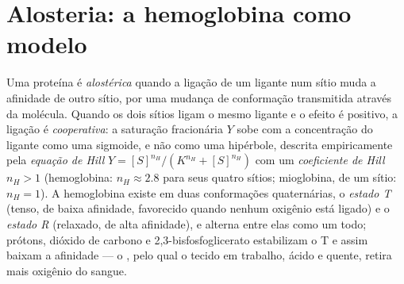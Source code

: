 \section{Alosteria: a hemoglobina como modelo}

\begin{definition}\label{def:b3:structural-biology:allostery}
Uma proteína é \emph{alostérica} quando a ligação de um ligante num
sítio muda a afinidade de outro sítio, por uma mudança de conformação
transmitida através da molécula. Quando os dois sítios ligam o mesmo
ligante e o efeito é positivo, a ligação é \emph{cooperativa}: a
saturação fracionária $Y$ sobe com a concentração do ligante como uma
sigmoide, e não como uma hipérbole, descrita empiricamente pela
\emph{equação de Hill} $Y = [S]^{n_{H}}/(K^{n_{H}} +
[S]^{n_{H}})$ com
um \emph{coeficiente de Hill} $n_{H} > 1$ (hemoglobina:
$n_{H} \approx 2.8$ para seus quatro sítios; mioglobina, de um sítio:
$n_{H} =
1$). A hemoglobina existe em duas conformações quaternárias, o
\emph{estado T} (tenso, de baixa afinidade, favorecido quando nenhum
oxigênio está ligado) e o \emph{estado R} (relaxado, de alta
afinidade), e alterna entre elas como um todo; prótons, dióxido de
carbono e 2,3-bisfosfoglicerato estabilizam o T e assim baixam a
afinidade --- o , pelo qual o tecido em trabalho, ácido e
quente, retira mais oxigênio do sangue.
\end{definition}

